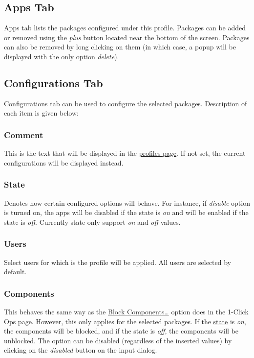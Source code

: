 \subsection{Apps Tab}\label{subsec:profile-apps-tab} %
Apps tab lists the packages configured under this profile. Packages can be added or removed using the \textit{plus}
button located near the bottom of the screen. Packages can also be removed by long clicking on them (in which case, a
popup will be displayed with the only option \textit{delete}).

\subsection{Configurations Tab}\label{subsec:profile-configurations-tab} %
Configurations tab can be used to configure the selected packages. Description of each item is given below:

\subsubsection{Comment} %
This is the text that will be displayed in the \hyperref[sec:profiles-page]{profiles page}. If not set, the current
configurations will be displayed instead.

\subsubsection{State}\label{subsubsec:profile-state} %
Denotes how certain configured options will behave. For instance, if \textit{disable} option is turned on, the apps will
be disabled if the state is \textit{on} and will be enabled if the state is \textit{off}. Currently state only support
\textit{on} and \textit{off} values.

\subsubsection{Users} %
Select users for which is the profile will be applied. All users are selected by default.

\subsubsection{Components} %
This behaves the same way as the \hyperref[subsec:block-components-dots]{Block Components\dots} option does in the
1-Click Ops page. However, this only applies for the selected packages. If the \hyperref[subsubsec:profile-state]{state}
is \textit{on}, the components will be blocked, and if the state is \textit{off}, the components will be unblocked.
The option can be disabled (regardless of the inserted values) by clicking on the \textit{disabled} button on the input
dialog.

